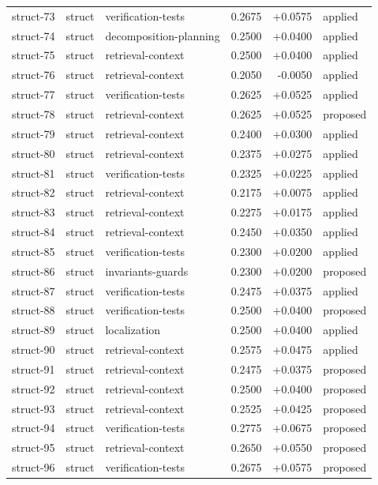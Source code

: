 \begin{center}
\begin{longtable}{llp{5.2cm}rrl}
struct-73 & struct & verification-tests & 0.2675 & +0.0575 & applied \\
struct-74 & struct & decomposition-planning & 0.2500 & +0.0400 & applied \\
struct-75 & struct & retrieval-context & 0.2500 & +0.0400 & applied \\
struct-76 & struct & retrieval-context & 0.2050 & -0.0050 & applied \\
struct-77 & struct & verification-tests & 0.2625 & +0.0525 & applied \\
struct-78 & struct & retrieval-context & 0.2625 & +0.0525 & proposed \\
struct-79 & struct & retrieval-context & 0.2400 & +0.0300 & applied \\
struct-80 & struct & retrieval-context & 0.2375 & +0.0275 & applied \\
struct-81 & struct & verification-tests & 0.2325 & +0.0225 & applied \\
struct-82 & struct & retrieval-context & 0.2175 & +0.0075 & applied \\
struct-83 & struct & retrieval-context & 0.2275 & +0.0175 & applied \\
struct-84 & struct & retrieval-context & 0.2450 & +0.0350 & applied \\
struct-85 & struct & verification-tests & 0.2300 & +0.0200 & applied \\
struct-86 & struct & invariants-guards & 0.2300 & +0.0200 & proposed \\
struct-87 & struct & verification-tests & 0.2475 & +0.0375 & applied \\
struct-88 & struct & verification-tests & 0.2500 & +0.0400 & proposed \\
struct-89 & struct & localization & 0.2500 & +0.0400 & applied \\
struct-90 & struct & retrieval-context & 0.2575 & +0.0475 & applied \\
struct-91 & struct & retrieval-context & 0.2475 & +0.0375 & proposed \\
struct-92 & struct & retrieval-context & 0.2500 & +0.0400 & proposed \\
struct-93 & struct & retrieval-context & 0.2525 & +0.0425 & proposed \\
struct-94 & struct & verification-tests & 0.2775 & +0.0675 & proposed \\
struct-95 & struct & retrieval-context & 0.2650 & +0.0550 & proposed \\
struct-96 & struct & verification-tests & 0.2675 & +0.0575 & proposed \\

\end{longtable}
\end{center}
